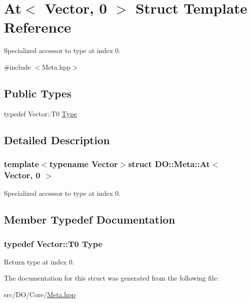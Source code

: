\hypertarget{struct_d_o_1_1_meta_1_1_at_3_01_vector_00_010_01_4}{\section{At$<$ Vector, 0 $>$ Struct Template Reference}
\label{struct_d_o_1_1_meta_1_1_at_3_01_vector_00_010_01_4}
}


Specialized accessor to type at index 0.  




{\ttfamily \#include $<$Meta.\-hpp$>$}

\subsection*{Public Types}
\begin{DoxyCompactItemize}
\item 
typedef Vector\-::\-T0 \hyperlink{struct_d_o_1_1_meta_1_1_at_3_01_vector_00_010_01_4_a80cc1e6a429f65758b288d63c0b96bcb}{Type}
\end{DoxyCompactItemize}


\subsection{Detailed Description}
\subsubsection*{template$<$typename Vector$>$struct D\-O\-::\-Meta\-::\-At$<$ Vector, 0 $>$}

Specialized accessor to type at index 0. 

\subsection{Member Typedef Documentation}
\hypertarget{struct_d_o_1_1_meta_1_1_at_3_01_vector_00_010_01_4_a80cc1e6a429f65758b288d63c0b96bcb}{
\subsubsection[{Type}]{\setlength{\rightskip}{0pt plus 5cm}typedef Vector\-::\-T0 {\bf Type}}}\label{struct_d_o_1_1_meta_1_1_at_3_01_vector_00_010_01_4_a80cc1e6a429f65758b288d63c0b96bcb}
Return type at index 0. 

The documentation for this struct was generated from the following file\-:\begin{DoxyCompactItemize}
\item 
src/\-D\-O/\-Core/\hyperlink{_meta_8hpp}{Meta.\-hpp}\end{DoxyCompactItemize}
